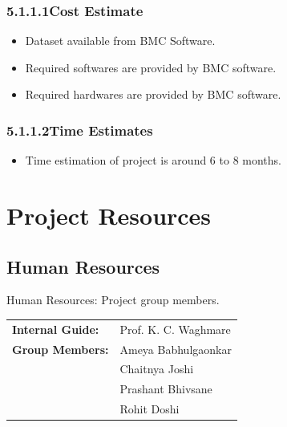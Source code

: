 \documentclass[oneside,a4paper,12pt]{book}
\begin{document}
\subsubsection*{5.1.1.1\hspace*{10pt}Cost Estimate}
\setlength{\parskip}{0.0pt}
\begin{itemize}
	\item Dataset available from BMC Software.\par

	\item Required softwares are provided by BMC software.\par

	\item Required hardwares are provided by BMC software.
\end{itemize}\par


\subsubsection*{5.1.1.2\hspace*{10pt}Time Estimates}
\begin{itemize}
	\item Time estimation of project is around 6 to 8 months.
\end{itemize}\par


\section{Project Resources}

\subsection{Human Resources}


\par Human Resources: Project group members.


\begin {table*}[!htpb]
\renewcommand{\arraystretch}{1.3}
    \begin{tabular}{ l l }
        \textbf{Internal Guide:} & Prof. K. C. Waghmare \\
        \textbf{Group Members:} & Ameya Babhulgaonkar\\
        & Chaitnya Joshi\\
        & Prashant Bhivsane\\
        & Rohit Doshi\\
    \end{tabular}
\end {table*}
\newpage
\end{document}
